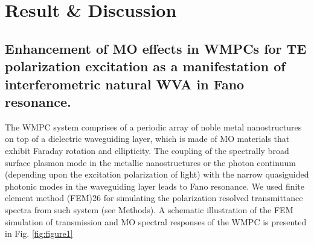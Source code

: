 \documentclass[13pt]{article}
\begin{document}
\section{Result \& Discussion}
\noindent
\par 
\subsection{Enhancement of MO effects in WMPCs for TE polarization excitation as a manifestation of interferometric natural WVA in Fano resonance.}
\noindent
\par
	The WMPC system comprises of a periodic array of noble metal nanostructures on top of a dielectric waveguiding layer, which is made of MO materials that exhibit Faraday rotation and ellipticity. The coupling of the spectrally broad surface plasmon mode in the metallic nanostructures or the photon continuum (depending upon the excitation polarization of light) with the narrow quasiguided photonic modes in the waveguiding layer leads to Fano resonance. We used finite element method (FEM)26 for simulating the polarization resolved transmittance spectra from such system (see Methods). A schematic illustration of the FEM simulation of transmission and MO spectral responses of the WMPC is presented in Fig. \ref{fig:figure1} 
\end{document}

